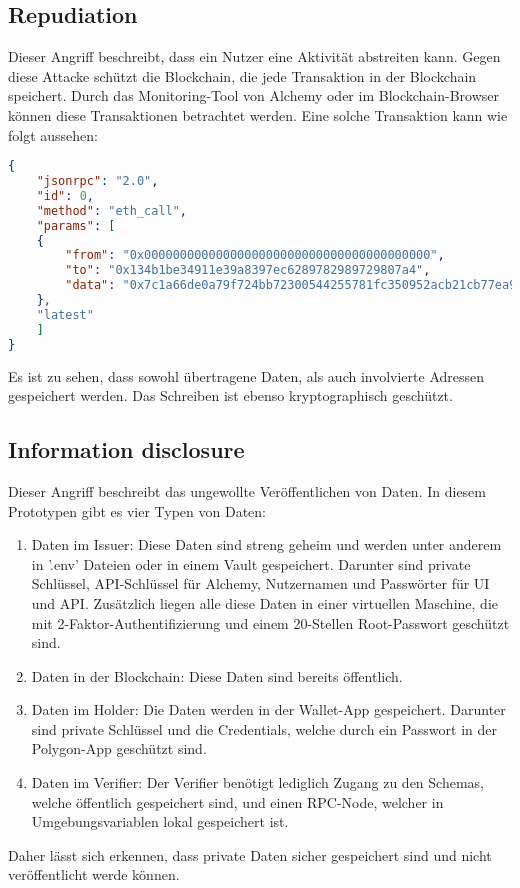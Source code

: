 \subsection{Repudiation}
\label{Repudiation}
Dieser Angriff beschreibt, dass ein Nutzer eine Aktivität abstreiten kann. Gegen diese Attacke schützt die Blockchain, die jede Transaktion in der Blockchain speichert. Durch das Monitoring-Tool von Alchemy oder im Blockchain-Browser können diese Transaktionen betrachtet werden. Eine solche Transaktion kann wie folgt aussehen:

\begin{lstlisting}[language=json,firstnumber=1]
{
	"jsonrpc": "2.0",
	"id": 0,
	"method": "eth_call",
	"params": [
	{
		"from": "0x0000000000000000000000000000000000000000",
		"to": "0x134b1be34911e39a8397ec6289782989729807a4",
		"data": "0x7c1a66de0a79f724bb72300544255781fc350952acb21cb77ea9a719c8eebb7d1a055ad0"
	},
	"latest"
	]
}
\end{lstlisting}	
Es ist zu sehen, dass sowohl übertragene Daten, als auch involvierte Adressen gespeichert werden. Das Schreiben ist ebenso kryptographisch geschützt.

\subsection{Information disclosure}
\label{disclosure}
Dieser Angriff beschreibt das ungewollte Veröffentlichen von Daten. In diesem Prototypen gibt es vier Typen von Daten:
\begin{enumerate}
	\item Daten im Issuer: Diese Daten sind streng geheim und werden unter anderem in '.env' Dateien oder in einem Vault gespeichert. Darunter sind private Schlüssel, API-Schlüssel für Alchemy, Nutzernamen und Passwörter für UI und API. Zusätzlich liegen alle diese Daten in einer virtuellen Maschine, die mit 2-Faktor-Authentifizierung und einem 20-Stellen Root-Passwort geschützt sind.
	\item Daten in der Blockchain: Diese Daten sind bereits öffentlich.
	\item Daten im Holder: Die Daten werden in der Wallet-App gespeichert. Darunter sind private Schlüssel und die Credentials, welche durch ein Passwort in der Polygon-App geschützt sind.
	\item Daten im Verifier: Der Verifier benötigt lediglich Zugang zu den Schemas, welche öffentlich gespeichert sind, und einen RPC-Node, welcher in Umgebungsvariablen lokal gespeichert ist.
\end{enumerate}
Daher lässt sich erkennen, dass private Daten sicher gespeichert sind und nicht veröffentlicht werde können.


